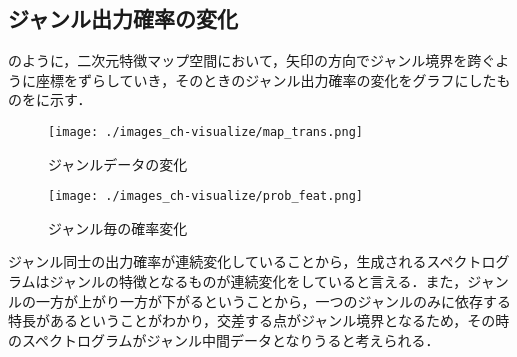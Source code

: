 \subsection{ジャンル出力確率の変化}
のように，二次元特徴マップ空間において，矢印の方向でジャンル境界を跨ぐように座標をずらしていき，そのときのジャンル出力確率の変化をグラフにしたものをに示す．
\begin{figure}
	\begin{center}
		\texttt{[image: ./images\_ch-visualize/map\_trans.png]}
		\caption{ジャンルデータの変化}
		\label{fig:featmap-trans}
	\end{center}
\end{figure}
\begin{figure}
	\begin{center}
		\texttt{[image: ./images\_ch-visualize/prob\_feat.png]}
		\caption{ジャンル毎の確率変化}
		\label{fig:ｔrans-graph}
	\end{center}
\end{figure}

ジャンル同士の出力確率が連続変化していることから，生成されるスペクトログラムはジャンルの特徴となるものが連続変化をしていると言える．また，ジャンルの一方が上がり一方が下がるということから，一つのジャンルのみに依存する特長があるということがわかり，交差する点がジャンル境界となるため，その時のスペクトログラムがジャンル中間データとなりうると考えられる．